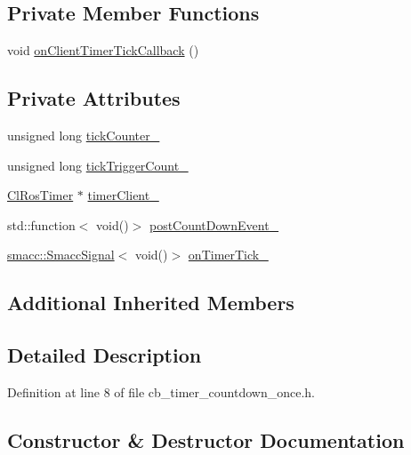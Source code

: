 \subsection*{Private Member Functions}
\begin{DoxyCompactItemize}
\item 
void \hyperlink{classcl__ros__timer_1_1CbTimerCountdownOnce_a2b02bbde9c9321781b70b9371b22673a}{on\+Client\+Timer\+Tick\+Callback} ()
\end{DoxyCompactItemize}
\subsection*{Private Attributes}
\begin{DoxyCompactItemize}
\item 
unsigned long \hyperlink{classcl__ros__timer_1_1CbTimerCountdownOnce_aea7372342782a0b6a1ba50b07ccb0962}{tick\+Counter\+\_\+}
\item 
unsigned long \hyperlink{classcl__ros__timer_1_1CbTimerCountdownOnce_aa3ab9c795f42141990ca69749a1ec010}{tick\+Trigger\+Count\+\_\+}
\item 
\hyperlink{classcl__ros__timer_1_1ClRosTimer}{Cl\+Ros\+Timer} $\ast$ \hyperlink{classcl__ros__timer_1_1CbTimerCountdownOnce_a2a969a829fcb39abcc0380ee420e3300}{timer\+Client\+\_\+}
\item 
std\+::function$<$ void()$>$ \hyperlink{classcl__ros__timer_1_1CbTimerCountdownOnce_a5ab3b0a0aa38f28bc3091583d30fe003}{post\+Count\+Down\+Event\+\_\+}
\item 
\hyperlink{classsmacc_1_1SmaccSignal}{smacc\+::\+Smacc\+Signal}$<$ void()$>$ \hyperlink{classcl__ros__timer_1_1CbTimerCountdownOnce_ac948b5efd5c9a397319668378463eadd}{on\+Timer\+Tick\+\_\+}
\end{DoxyCompactItemize}
\subsection*{Additional Inherited Members}


\subsection{Detailed Description}


Definition at line 8 of file cb\+\_\+timer\+\_\+countdown\+\_\+once.\+h.



\subsection{Constructor \& Destructor Documentation}
\mbox{\label{classcl__ros__timer_1_1CbTimerCountdownOnce_a41161c36e1c3b1767c02884d28649ccd}} 
